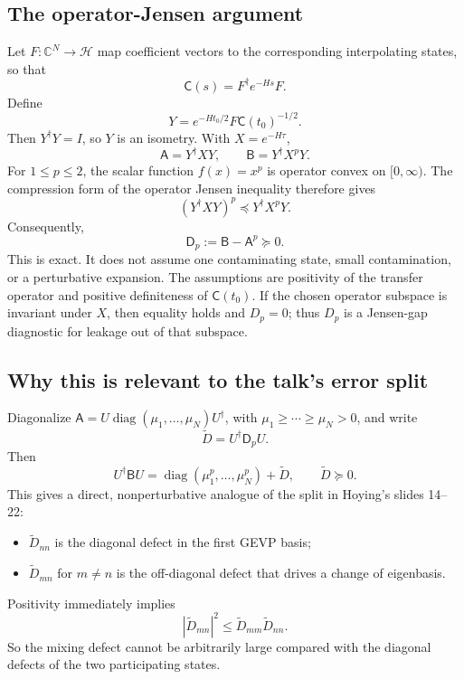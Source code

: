 \documentclass[11pt]{article}
\newcommand{\C}{\mathsf C}
\newcommand{\A}{\mathsf A}
\newcommand{\B}{\mathsf B}
\newcommand{\D}{\mathsf D}
\begin{document}
\subsection{The operator-Jensen argument}
Let $F:\mathbb C^N\to\mathcal H$ map coefficient vectors to the corresponding interpolating states, so that
\[
\C(s)=F^\dagger e^{-Hs}F.
\]
Define
\[
Y=e^{-Ht_0/2}F\C(t_0)^{-1/2}.
\]
Then $Y^\dagger Y=I$, so $Y$ is an isometry. With $X=e^{-H\tau}$,
\[
\A=Y^\dagger X Y,\qquad
\B=Y^\dagger X^pY.
\]
For $1\leq p\leq2$, the scalar function $f(x)=x^p$ is operator convex on $[0,\infty)$. The compression form of the operator Jensen inequality therefore gives
\[
(Y^\dagger X Y)^p\preceq Y^\dagger X^pY.
\]
Consequently,
\begin{equation}
\boxed{\D_p:=\B-\A^p\succeq0.}
\label{eq:jensen}
\end{equation}
This is exact. It does not assume one contaminating state, small contamination, or a perturbative expansion. The assumptions are positivity of the transfer operator and positive definiteness of $\C(t_0)$. If the chosen operator subspace is invariant under $X$, then equality holds and $D_p=0$; thus $D_p$ is a Jensen-gap diagnostic for leakage out of that subspace.

\subsection{Why this is relevant to the talk's error split}
Diagonalize $\A=U\operatorname{diag}(\mu_1,\ldots,\mu_N)U^\dagger$, with $\mu_1\geq\cdots\geq\mu_N>0$, and write
\[
\widetilde D=U^\dagger\D_pU.
\]
Then
\[
U^\dagger\B U=\operatorname{diag}(\mu_1^p,\ldots,\mu_N^p)+\widetilde D,
\qquad \widetilde D\succeq0.
\]
This gives a direct, nonperturbative analogue of the split in Hoying's slides 14--22:
\begin{itemize}
\item $\widetilde D_{nn}$ is the diagonal defect in the first GEVP basis;
\item $\widetilde D_{mn}$ for $m\ne n$ is the off-diagonal defect that drives a change of eigenbasis.
\end{itemize}
Positivity immediately implies
\begin{equation}
\boxed{|\widetilde D_{mn}|^2\leq \widetilde D_{mm}\widetilde D_{nn}.}
\label{eq:cs}
\end{equation}
So the mixing defect cannot be arbitrarily large compared with the diagonal defects of the two participating states.
\end{document}
